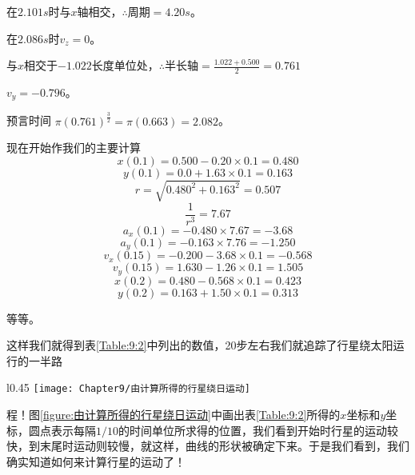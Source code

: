 \begin{small}
    \scriptsize
    在$2.101s$时与$x$轴相交，$\therefore$周期$=4.20s$。
\vspace{-2pt}

    在$2.086s$时$v_z=0$。
\vspace{-2pt}

    与$x$相交于$-1.022$长度单位处，$\therefore$半长轴$=\frac{1.022+0.500}{2}=0.761$
\vspace{-2pt}

    $v_y=-0.796$。
\vspace{-5pt}

    预言时间 $\pi(0.761)^{\frac{3}{2}}=\pi(0.663)=2.082$。
\end{small}

\noindent 现在开始作我们的主要计算
\begin{equation*}
    x(0.1)=0.500 - 0.20 \times 0.1 = 0.480
\end{equation*}
\begin{equation*}
    y(0.1)=0.0 + 1.63 \times 0.1 = 0.163
\end{equation*}
\begin{equation*}
    r=\sqrt{0.480^2+0.163^2}=0.507
\end{equation*}
\begin{equation*}
    \frac{1}{r^3}=7.67
\end{equation*}
\begin{equation*}
    a_x(0.1)=-0.480 \times 7.67 = -3.68
\end{equation*}
\begin{equation*}
    a_y(0.1)=-0.163 \times 7.76 = -1.250
\end{equation*}
\begin{equation*}
    v_x(0.15)=-0.200-3.68 \times 0.1 = -0.568
\end{equation*}
\begin{equation*}
    v_y(0.15)=1.630 - 1.26 \times 0.1 = 1.505
\end{equation*}
\begin{equation*}
    x(0.2) = 0.480 - 0.568 \times 0.1 = 0.423
\end{equation*}
\begin{equation*}
    y(0.2) = 0.163 + 1.50 \times 0.1 = 0.313
\end{equation*}
\centerline{等等。}
这样我们就得到表\ref{Table:9:2}中列出的数值，20步左右我们就追踪了行星绕太阳运行的一半路
\begin{wrapfigure}{l}{0.45\textwidth}
    \centering
    \texttt{[image: Chapter9/由计算所得的行星绕日运动]}
    \caption{由计算所得的行星绕日运动}
    \label{figure:由计算所得的行星绕日运动}
\end{wrapfigure}
程！图\ref{figure:由计算所得的行星绕日运动}中画出表\ref{Table:9:2}所得的$x$坐标和$y$坐标，圆点表示每隔$1/10$的时间单位所求得的位置，我们看到开始时行星的运动较快，到末尾时运动则较慢，就这样，曲线的形状被确定下来。于是我们看到，我们确实知道如何来计算行星的运动了！

